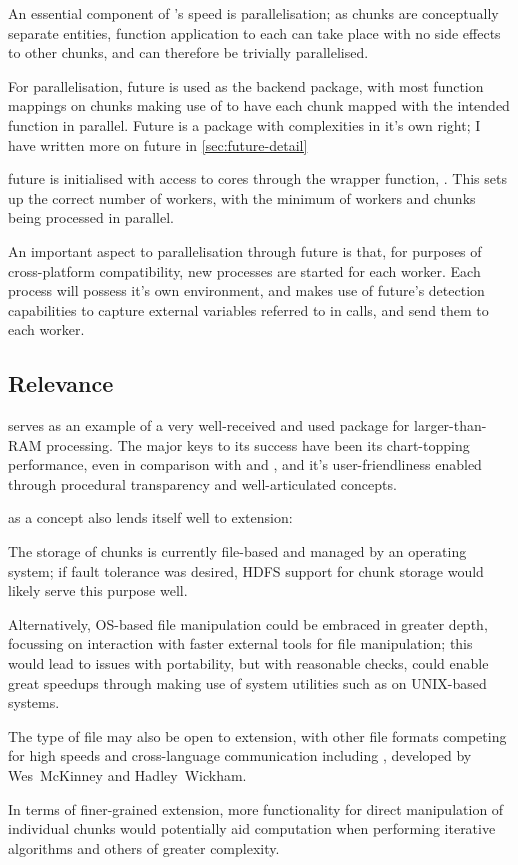 An essential component of 's speed is parallelisation; as
chunks are conceptually separate entities, function application to each
can take place with no side effects to other chunks, and can therefore
be trivially parallelised.

For parallelisation, future is used as the backend package, with most
function mappings on chunks making use of 
to have each chunk mapped with the intended function in parallel. Future
is a package with complexities in it's own right; I have written more on
future in \cref{sec:future-detail}

future is initialised with access to cores through the wrapper function,
\cite{zj19:_key}.
This sets up the correct number of workers, with the minimum of workers
and chunks being processed in parallel.

An important aspect to parallelisation through future is that, for
purposes of cross-platform compatibility, new \R{} processes are started
for each worker\cite{zj19:_using}. Each process will possess it's own
environment, and  makes use of future's detection capabilities
to capture external variables referred to in calls, and send them to
each worker.

\subsection{Relevance}\label{sec:relevance}

 serves as an example of a very well-received and used package
for larger-than-RAM processing. The major keys to its success have been
its chart-topping performance, even in comparison with  and ,
and it's user-friendliness enabled through procedural transparency and
well-articulated concepts.

 as a concept also lends itself well to extension:

The storage of chunks is currently file-based and managed by an
operating system; if fault tolerance was desired, HDFS support for chunk
storage would likely serve this purpose well.

Alternatively, OS-based file manipulation could be embraced in greater
depth, focussing on interaction with faster external tools for file
manipulation; this would lead to issues with portability, but with
reasonable checks, could enable great speedups through making use of
system utilities such as  on UNIX-based systems.

The type of file may also be open to extension, with other file formats
competing for high speeds and cross-language communication including , developed by Wes~McKinney and Hadley~Wickham\cite{wes16}.

In terms of finer-grained extension, more functionality for direct
manipulation of individual chunks would potentially aid computation when
performing iterative algorithms and others of greater complexity.
